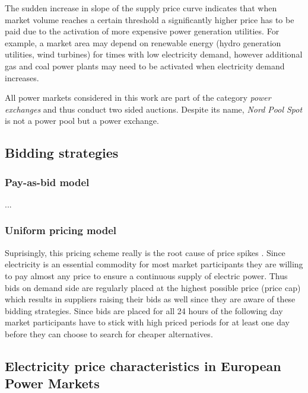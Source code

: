 The sudden increase in slope of the supply price curve indicates that when market volume reaches a certain threshold a significantly higher price has to be paid due to the activation of more expensive power generation utilities. For example, a market area may depend on renewable energy (hydro generation utilities, wind turbines) for times with low electricity demand, however additional gas and coal power plants may need to be activated when electricity demand increases. 

All power markets considered in this work are part of the category \textit{power exchanges} and thus conduct two sided auctions. Despite its name, \textit{Nord Pool Spot} is not a power pool but a power exchange. 



\subsection{Bidding strategies}


\subsubsection{Pay-as-bid model}
...

\subsubsection{Uniform pricing model}



Suprisingly, this pricing scheme really is the root cause of price spikes \cite{weron2007modeling}. Since electricity is an essential commodity for most market participants they are willing to pay almost any price to ensure a continuous supply of electric power. Thus bids on demand side are regularly placed at the highest possible price (price cap) which results in suppliers raising their bids as well since they are aware of these bidding strategies. Since bids are placed for all 24 hours of the following day market participants have to stick with high priced periods for at least one day before they can choose to search for cheaper alternatives. 


\subsection{Electricity price characteristics in European Power Markets}

